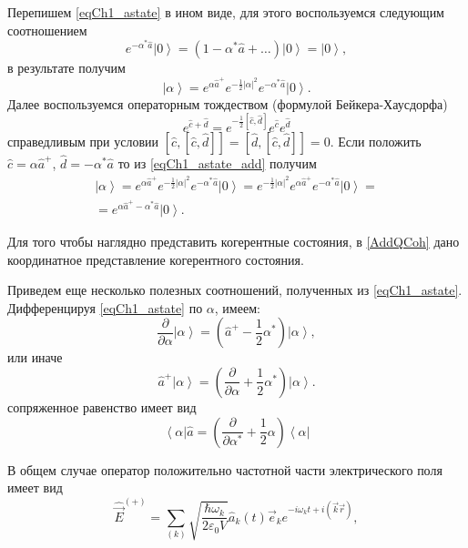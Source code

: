 Перепишем \eqref{eqCh1_astate} в ином виде, для этого воспользуемся
следующим соотношением
\[
e^{- \alpha^{*} \hat{a}} \left|0\right> = \left(1 - \alpha^{*} \hat{a} +
\dots\right) \left|0\right> = \left|0\right>,
\]
в результате получим
\begin{equation}
\left|\alpha\right> = 
e^{\alpha \hat{a}^{+}} 
e^{-\frac{1}{2}\left|\alpha\right|^2}
e^{- \alpha^{*} \hat{a}} 
\left|0\right>.
\label{eqCh1_astate_add}
\end{equation}
Далее воспользуемся операторным тождеством (формулой Бейкера-Хаусдорфа)
\begin{equation}
e^{\hat{c} + \hat{d}} = e^{- \frac{1}{2}\left[\hat{c},
    \hat{d}\right]}e^{\hat{c}} e^{\hat{d}} 
\label{eqPart1Ch1_BeikerHausdorf}
\end{equation}
справедливым при условии  
$\left[\hat{c},\left[\hat{c}, \hat{d}\right]\right] =
\left[\hat{d},\left[\hat{c}, \hat{d}\right]\right] = 0$.
Если положить $\hat{c} = \alpha\hat{a}^{+}$, $\hat{d} = -\alpha^*\hat{a}$
то из \eqref{eqCh1_astate_add}  получим 
\begin{eqnarray}
\left|\alpha\right> =  
e^{\alpha \hat{a}^{+}} 
e^{-\frac{1}{2}\left|\alpha\right|^2}
e^{- \alpha^{*} \hat{a}} 
\left|0\right> =
e^{-\frac{1}{2}\left|\alpha\right|^2}
e^{\alpha \hat{a}^{+}} 
e^{- \alpha^{*} \hat{a}} 
\left|0\right> = 
\nonumber \\
=
e^{\alpha \hat{a}^{+} - \alpha^{*} \hat{a}}\left|0\right>.
\label{eqCh1_astate4squeezed}
\end{eqnarray}

Для того чтобы наглядно представить когерентные состояния, в
\autoref{AddQCoh} дано координатное представление когерентного состояния. 

Приведем еще несколько полезных соотношений, полученных из
\eqref{eqCh1_astate}. Дифференцируя \eqref{eqCh1_astate} по  $\alpha$,
имеем:  
\[
\frac{\partial}{\partial \alpha}\left|\alpha\right> = 
\left( \hat{a}^{+} - \frac{1}{2}\alpha^{*}\right)\left|\alpha\right>,
\]
или иначе 
\[
\hat{a}^{+}\left|\alpha\right> = \left(\frac{\partial}{\partial
  \alpha} +  \frac{1}{2}\alpha^{*}\right)\left|\alpha\right>.
\]
сопряженное равенство имеет вид
\[
\left<\alpha\right|\hat{a} = \left(\frac{\partial}{\partial
  \alpha^{*}} +  \frac{1}{2}\alpha\right)\left<\alpha\right|
\]

В общем случае оператор положительно частотной части электрического поля имеет вид
\[
\hat{\vec{E}}^{(+)} = \sum_{(k)} \sqrt{\frac{\hbar \omega_k}{2 \varepsilon_0
V}} \hat{a}_k\left(t\right) \vec{e}_k e^{-i \omega_k t + i \left(\vec{k}\vec{r}
  \right)}, 
\]

